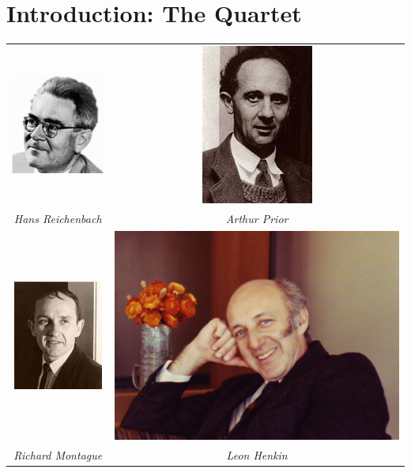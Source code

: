 \section{Introduction: The Quartet} \label{introduction}

\begin{center}
\begin{tabular}{cc}
\includegraphics[scale=.5]{reichenbach_med.jpg} &
\includegraphics[scale=.6]{prior.jpg} \\
\emph{Hans Reichenbach}
& \emph{Arthur Prior}\\
\includegraphics[scale=.8]{montague.jpg} &
\includegraphics[scale=.1]{henkin73.jpg}\\
\emph{Richard Montague}
&\emph{Leon Henkin}
\end{tabular}%
\end{center}%

